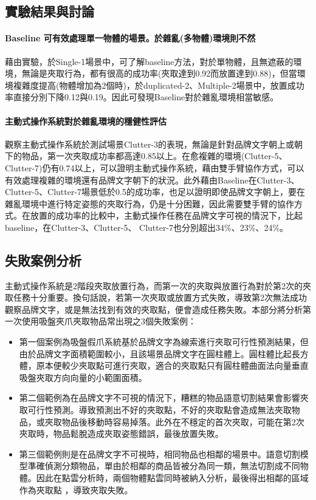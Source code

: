 \subsection{實驗結果與討論}

\paragraph{Baseline 可有效處理單一物體的場景。於雜亂(多物體)環境則不然}
藉由實驗，於Single-1場景中，可了解baseline方法，對於單物體，且無遮蔽的環境，無論是夾取行為，都有很高的成功率(夾取達到0.92而放置達到0.88)，但當環境複雜度提高(物體增加為2個時)，於duplicated-2、Multiple-2場景中，放置成功率直接分別下降0.12與0.19。因此可發現Baseline對於雜亂環境相當敏感。

\paragraph{主動式操作系統對於雜亂環境的穩健性評估}
觀察主動式操作系統於測試場景Clutter-3的表現，無論是針對品牌文字朝上或朝下的物品，第一次夾取成功率都高達0.85以上。在愈複雜的環境(Clutter-5、Clutter-7)仍有0.74以上，可以證明主動式操作系統，藉由雙手臂協作方式，可以有效處理複雜的環境還有品牌文字朝下的狀況。此外藉由Baseline在Clutter-3、Clutter-5、Clutter-7場景低於0.5的成功率，也足以證明即使品牌文字朝上，要在雜亂環境中進行特定姿態的夾取行為，仍是十分困難，因此需要雙手臂的協作方式。在放置的成功率的比較中，主動式操作任務在品牌文字可視的情況下，比起baseline，在Clutter-3、Clutter-5、 Clutter-7也分別超出34\%、23\%、24\%。

\subsection{失敗案例分析}
主動式操作系統是2階段夾取放置行為，而第一次的夾取與放置行為對於第2次的夾取任務十分重要。換句話說，若第一次夾取或放置方式失敗，導致第2次無法成功觀察品牌文字，或是無法找到有效的夾取點，便會造成任務失敗。本部分將分析第一次使用吸盤夾爪夾取物品常出現之3個失敗案例：
\begin{itemize}
\item 第一個案例為吸盤假爪系統基於品牌文字為線索進行夾取可行性預測結果，但由於品牌文字面積範圍較小，且該場景品牌文字在圓柱體上。圓柱體比起長方體，原本便較少夾取點可進行夾取，適合的夾取點只有圓柱體曲面法向量垂直吸盤夾取方向向量的小範圍面積。
\item 第二個範例為在品牌文字不可視的情況下，糟糕的物品語意切割結果會影響夾取可行性預測。導致預測出不好的夾取點，不好的夾取點會造成無法夾取物品，或夾取物品後移動時容易掉落。此外在不穩定的首次夾取，可能在第2次夾取時，物品鬆脫造成夾取姿態錯誤，最後放置失敗。
\item 第三個範例則是在品牌文字不可視時，相同物品也相鄰的場景中。語意切割模型準確偵測分類物品，單由於相鄰的商品皆被分為同一類，無法切割成不同物體。因此在點雲分析時，兩個物體點雲同時被納入分析，最後得出相鄰的區域作為夾取點
，導致夾取失敗。
\end{itemize}



